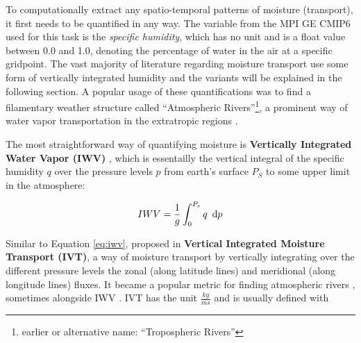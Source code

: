 To computationally extract any spatio-temporal patterns of moisture (transport), it first needs to be quantified in any way.
The variable from the MPI GE CMIP6 used for this task is the \textit{specific humidity}, which has no unit and is a float value between 0.0 and 1.0, denoting the percentage of water in the air at a specific gridpoint. 
The vast majority of literature regarding moisture transport use some form of vertically integrated humidity and the variants will be explained in the following section.  
A popular usage of these quantifications was to find a filamentary weather structure called \enquote{Atmospheric Rivers}\footnote{earlier or alternative name: \enquote{Tropospheric Rivers}}, a prominent way of water vapor transportation in the extratropic regions \cite{gimeno_atmospheric_2014}. 


The most straightforward way of quantifying moisture is \textbf{Vertically Integrated Water Vapor (IWV)} \cite{gimeno_atmospheric_2014, schluessel_atmospheric_1990, bao_interpretation_2006, neiman_meteorological_2008, zhao_lagrangian_2021}, which is essentailly the vertical integral of the specific humidity $q$ over the pressure levels $p$ from earth's surface $P_S$ to some upper limit in the atmosphere:


\begin{equation}
\label{eq:iwv}
IWV = \frac{1}{g} \int^{P_s}_0 q ~\operatorname{d}\!{p}
\end{equation}






Similar to Equation \ref{eq:iwv},  \citeauthor{zhu_proposed_1998} proposed in \cite{zhu_proposed_1998} \textbf{Vertical Integrated Moisture Transport (IVT)}, a way of moisture transport by vertically integrating over the different pressure levels the zonal (along latitude lines) and meridional (along longitude lines) fluxes.
It became a popular metric for finding atmospheric rivers \cite{gimeno_atmospheric_2014}, sometimes alongside IWV \cite{eiras-barca_seasonal_2016}.
IVT has the unit $\frac{kg}{ms}$ and is usually defined with

